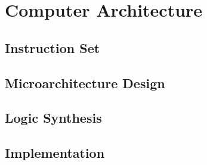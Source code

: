 \chapter{Computer Architecture}

\section{Instruction Set}
\section{Microarchitecture Design}
\section{Logic Synthesis}
\section{Implementation}